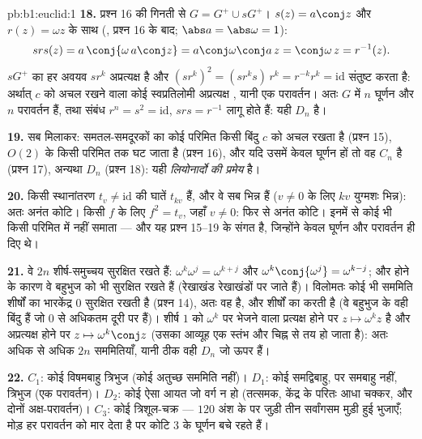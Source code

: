 \begin{solution}{pb:b1:euclid:1}
\textbf{18.} प्रश्न 16 की गिनती से $G = G^{+} \cup sG^{+}$। $s(z) = a\conj
z$ और $r(z) = \omega z$ के साथ (, प्रश्न 16 के बाद; $\abs a =
\abs\omega = 1$):
\[
s r s(z) = a\,\conj{\omega\,a\conj z}
= a\conj\omega\conj a\,z = \conj\omega\,z = r^{-1}(z) .
\]
$sG^{+}$ का हर अवयव $sr^k$ अप्रत्यक्ष है और $(sr^k)^2 = (sr^ks)\,r^k =
r^{-k}r^k = \mathrm{id}$ संतुष्ट करता है: अर्थात् $c$ को अचल रखने वाला कोई
स्वप्रतिलोमी अप्रत्यक्ष , यानी एक परावर्तन। अतः $G$ में $n$ घूर्णन और
$n$ परावर्तन हैं, तथा संबंध $r^n = s^2 = \mathrm{id}$, $srs = r^{-1}$ लागू
होते हैं: यही  $D_n$ है।

\textbf{19.} सब मिलाकर: समतल-समदूरकों का कोई परिमित  किसी बिंदु $c$ को
अचल रखता है (प्रश्न 15), $O(2)$ के किसी परिमित  तक घट जाता है (प्रश्न
16), और यदि उसमें केवल घूर्णन हों तो वह $C_n$ है (प्रश्न 17), अन्यथा $D_n$
(प्रश्न 18): यही \emph{लियोनार्दो की प्रमेय} है।

\textbf{20.} किसी स्थानांतरण $t_v \neq \mathrm{id}$ की घातें $t_{kv}$ हैं,
और वे सब भिन्न हैं ($v \neq 0$ के लिए $kv$ युग्मशः भिन्न): अतः अनंत कोटि।
किसी  $f$ के लिए $f^2 = t_v$, जहाँ $v \neq 0$: फिर से अनंत
कोटि। इनमें से कोई भी किसी परिमित  में नहीं समाता --- और यह प्रश्न
15--19 के संगत है, जिन्होंने केवल घूर्णन और परावर्तन ही दिए थे।

\textbf{21.} वे $2n$  शीर्ष-समुच्चय सुरक्षित रखते हैं: $\omega^k
\omega^j = \omega^{k+j}$ और $\omega^k\conj{\omega^j} = \omega^{k-j}$; और
 होने के कारण वे बहुभुज को भी सुरक्षित रखते हैं (रेखाखंड रेखाखंडों पर
जाते हैं)। विलोमतः कोई भी सममिति शीर्षों का भारकेंद्र $0$ सुरक्षित रखती है
(प्रश्न 14), अतः वह  है, और शीर्षों का  करती है (वे बहुभुज के वही
बिंदु हैं जो $0$ से अधिकतम दूरी पर हैं)। शीर्ष $1$ को $\omega^k$ पर भेजने
वाला   प्रत्यक्ष होने पर $z \mapsto \omega^k z$ है और अप्रत्यक्ष
होने पर $z \mapsto \omega^k\conj z$ (उसका आव्यूह एक स्तंभ और चिह्न से तय हो
जाता है): अतः अधिक से अधिक $2n$ सममितियाँ, यानी ठीक वही $D_n$ जो ऊपर हैं।

\textbf{22.} $C_1$: कोई विषमबाहु त्रिभुज (कोई अतुच्छ सममिति नहीं)। $D_1$:
कोई समद्विबाहु, पर समबाहु नहीं, त्रिभुज (एक परावर्तन)। $D_2$: कोई ऐसा आयत जो
वर्ग न हो (तत्समक, केंद्र के परितः आधा चक्कर, और दोनों अक्ष-परावर्तन)।
$C_3$: कोई त्रिशूल-चक्र --- $120$ अंश के  पर जुड़ी तीन सर्वांगसम मुड़ी
हुई भुजाएँ; मोड़ हर परावर्तन को मार देता है पर कोटि $3$ के घूर्णन बचे रहते
हैं।


\end{solution}
